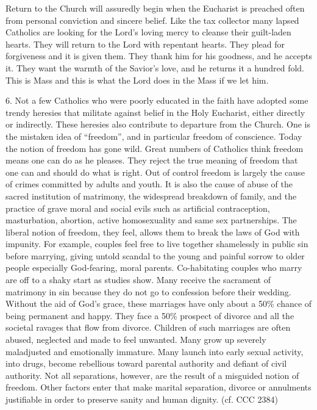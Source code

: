 \documentclass[oneside]{book}
\begin{document}
Return to the Church will assuredly begin when the Eucharist is preached often
from personal conviction and sincere belief. Like the tax collector many lapsed
Catholics are looking for the Lord's loving mercy to cleanse their guilt-laden
hearts. They will return to the Lord with repentant hearts. They plead for
forgiveness and it is given them. They thank him for his goodness, and he
accepts it. They want the warmth of the Savior's love, and he returns it a
hundred fold. This is Mass and this is what the Lord does in the Mass if we let
him.

6. Not a few Catholics who were poorly educated in the faith have adopted some
trendy heresies that militate against belief in the Holy Eucharist, either
directly or indirectly. These heresies also contribute to departure from the
Church. One is the mistaken idea of ``freedom'', and in particular freedom of
conscience. Today the notion of freedom has gone wild. Great numbers of
Catholics think freedom means one can do as he pleases. They reject the true
meaning of freedom that one can and should do what is right. Out of control
freedom is largely the cause of crimes committed by adults and youth. It is also
the cause of abuse of the sacred institution of matrimony, the widespread
breakdown of family, and the practice of grave moral and social evils such as
artificial contraception, masturbation, abortion, active homosexuality and same
sex partnerships. The liberal notion of freedom, they feel, allows them to break
the laws of God with impunity. For example, couples feel free to live together
shamelessly in public sin before marrying, giving untold scandal to the young
and painful sorrow to older people especially God-fearing, moral parents.
Co-habitating couples who marry are off to a shaky start as studies show. Many
receive the sacrament of matrimony in sin because they do not go to confession
before their wedding. Without the aid of God's grace, these marriages have only
about a 50\% chance of being permanent and happy. They face a 50\% prospect of
divorce and all the societal ravages that flow from divorce. Children of such
marriages are often abused, neglected and made to feel unwanted. Many grow up
severely maladjusted and emotionally immature. Many launch into early sexual
activity, into drugs, become rebellious toward parental authority and defiant of
civil authority. Not all separations, however, are the result of a misguided
notion of freedom. Other factors enter that make marital separation, divorce or
annulments justifiable in order to preserve sanity and human dignity. (cf. CCC
2384)
\end{document}
